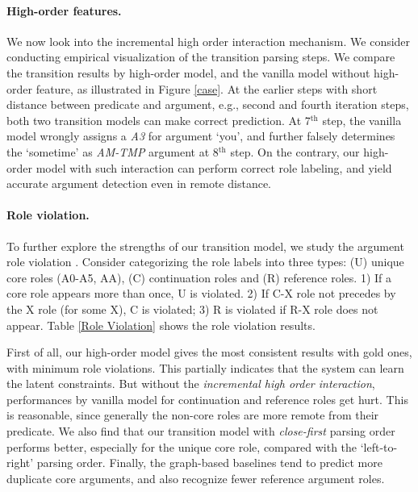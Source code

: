 \documentclass[letterpaper]{article} %
\begin{document}
\begin{CJK}{UTF8}{gbsn}
\paragraph{High-order features.}

We now look into the incremental high order interaction mechanism.
We consider conducting empirical visualization of the transition parsing steps.
We compare the transition results by high-order model, and the vanilla model without high-order feature, as illustrated in Figure \ref{case}.
At the earlier steps with short distance between predicate and argument, e.g., second and fourth iteration steps, both two transition models can make correct prediction.
At 7$^{\text{th}}$ step, the vanilla model wrongly assigns a \emph{A3} for argument `you', and further falsely determines the `sometime' as \emph{AM-TMP} argument at 8$^{\text{th}}$ step.
On the contrary, our high-order model with such interaction can perform correct role labeling, and yield accurate argument detection even in remote distance.







\paragraph{Role violation.}

To further explore the strengths of our transition model, we study the argument role violation \cite{punyakanok-etal-2004-semantic,fitzgerald-etal-2015-semantic,he-etal-2018-jointly}.
Consider categorizing the role labels into three types: (U) unique core roles (A0-A5, AA), (C) continuation roles and (R) reference roles.
1) If a core role appears more than once, U is violated.
2) If C-X role not precedes by the X role (for some X), C is violated;
3) R is violated if R-X role does not appear.
Table \ref{Role Violation} shows the role violation results.



First of all, our high-order model gives the most consistent results with gold ones, with minimum role violations.
This partially indicates that the system can learn the latent constraints.
But without the \emph{incremental high order interaction}, performances by vanilla model for continuation and reference roles get hurt.
This is reasonable, since generally the non-core roles are more remote from their predicate.
We also find that our transition model with \emph{close-first} parsing order performs better, especially for the unique core role, compared with the `left-to-right' parsing order.
Finally, the graph-based baselines tend to predict more duplicate core arguments, and also recognize fewer reference argument roles.










\end{CJK}
\end{document}
